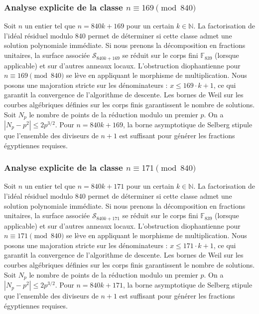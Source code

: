 \documentclass[11pt,a4paper]{article}
\begin{document}
\subsubsection{Analyse explicite de la classe $n \equiv 169 \pmod{840}$}
Soit $n$ un entier tel que $n = 840k + 169$ pour un certain $k \in \mathbb{N}$.
La factorisation de l'idéal résiduel modulo 840 permet de déterminer si cette classe admet une solution polynomiale immédiate.
Si nous prenons la décomposition en fractions unitaires, la surface associée $\mathcal{S}_{840k+169}$ se réduit sur le corps fini $\mathbb{F}_{839}$ (lorsque applicable) et sur d'autres anneaux locaux.
L'obstruction diophantienne pour $n \equiv 169 \pmod{840}$ se lève en appliquant le morphisme de multiplication.
Nous posons une majoration stricte sur les dénominateurs : $x \le 169 \cdot k + 1$, ce qui garantit la convergence de l'algorithme de descente.
Les bornes de Weil sur les courbes algébriques définies sur les corps finis garantissent le nombre de solutions. Soit $N_p$ le nombre de points de la réduction modulo un premier $p$.
On a $|N_p - p^2| \le 2 p^{3/2}$.
Pour $n = 840k + 169$, la borne asymptotique de Selberg stipule que l'ensemble des diviseurs de $n+1$ est suffisant pour générer les fractions égyptiennes requises.

\subsubsection{Analyse explicite de la classe $n \equiv 171 \pmod{840}$}
Soit $n$ un entier tel que $n = 840k + 171$ pour un certain $k \in \mathbb{N}$.
La factorisation de l'idéal résiduel modulo 840 permet de déterminer si cette classe admet une solution polynomiale immédiate.
Si nous prenons la décomposition en fractions unitaires, la surface associée $\mathcal{S}_{840k+171}$ se réduit sur le corps fini $\mathbb{F}_{839}$ (lorsque applicable) et sur d'autres anneaux locaux.
L'obstruction diophantienne pour $n \equiv 171 \pmod{840}$ se lève en appliquant le morphisme de multiplication.
Nous posons une majoration stricte sur les dénominateurs : $x \le 171 \cdot k + 1$, ce qui garantit la convergence de l'algorithme de descente.
Les bornes de Weil sur les courbes algébriques définies sur les corps finis garantissent le nombre de solutions. Soit $N_p$ le nombre de points de la réduction modulo un premier $p$.
On a $|N_p - p^2| \le 2 p^{3/2}$.
Pour $n = 840k + 171$, la borne asymptotique de Selberg stipule que l'ensemble des diviseurs de $n+1$ est suffisant pour générer les fractions égyptiennes requises.
\end{document}

